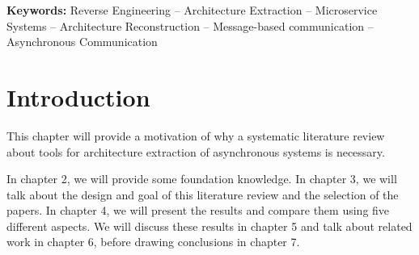 
\textbf{Keywords:} Reverse Engineering -- Architecture Extraction -- Microservice Systems -- Architecture Reconstruction -- Message-based communication -- Asynchronous Communication

\section{Introduction}
\label{cha:Introduction}
This chapter will provide a motivation of why a systematic literature review about tools for architecture extraction of asynchronous systems is necessary.

In chapter 2, we will provide some foundation knowledge.
In chapter 3, we will talk about the design and goal of this literature review and the selection of the papers.
In chapter 4, we will present the results and compare them using five different aspects.
We will discuss these results in chapter 5 and talk about related work in chapter 6, before drawing conclusions in chapter 7.
